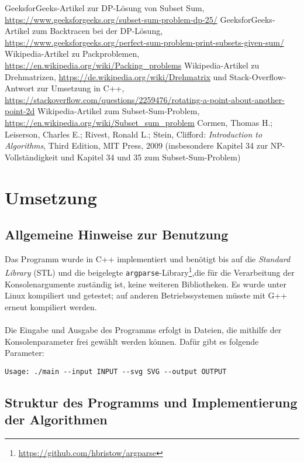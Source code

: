 \documentclass[a4paper, notitlepage, 12pt,headinclude]{scrartcl}
\begin{document}
\begin{thebibliography}{xx}
	 GeeksforGeeks-Artikel zur DP-Lösung von Subset Sum, \url{https://www.geeksforgeeks.org/subset-sum-problem-dp-25/}
	 GeeksforGeeks-Artikel zum Backtracen bei der DP-Lösung, \url{https://www.geeksforgeeks.org/perfect-sum-problem-print-subsets-given-sum/}
	 Wikipedia-Artikel zu Packproblemen, \url{https://en.wikipedia.org/wiki/Packing_problems}
	 Wikipedia-Artikel zu Drehmatrizen, \url{https://de.wikipedia.org/wiki/Drehmatrix} und Stack-Overflow-Antwort zur Umsetzung in C++, \url{https://stackoverflow.com/questions/2259476/rotating-a-point-about-another-point-2d}
	 Wikipedia-Artikel zum Subset-Sum-Problem, \url{https://en.wikipedia.org/wiki/Subset_sum_problem}
	 Cormen, Thomas H.; Leiserson, Charles E.; Rivest, Ronald L.; Stein, Clifford: \textit{Introduction to Algorithms}, Third Edition, MIT Press, 2009 (insbesondere Kapitel 34 zur NP-Vollständigkeit und Kapitel 34 und 35 zum Subset-Sum-Problem)
\end{thebibliography}
\section{Umsetzung}
\subsection{Allgemeine Hinweise zur Benutzung}
Das Programm wurde in C++ implementiert und benötigt bis auf die \textit{Standard Library} (STL) und die beigelegte \texttt{argparse}-Library\footnote{\url{https://github.com/hbristow/argparse}},die für die Verarbeitung der Konsolenargumente zuständig ist, keine weiteren Bibliotheken. Es wurde unter Linux kompiliert und getestet; auf anderen Betriebssystemen müsste mit G++ erneut kompiliert werden. \\ \\
Die Eingabe und Ausgabe des Programms erfolgt in Dateien, die mithilfe der Konsolenparameter frei gewählt werden können. Dafür gibt es folgende Parameter:
\begin{verbatim}
Usage: ./main --input INPUT --svg SVG --output OUTPUT
\end{verbatim}
\subsection{Struktur des Programms und Implementierung der Algorithmen}
\end{document}
